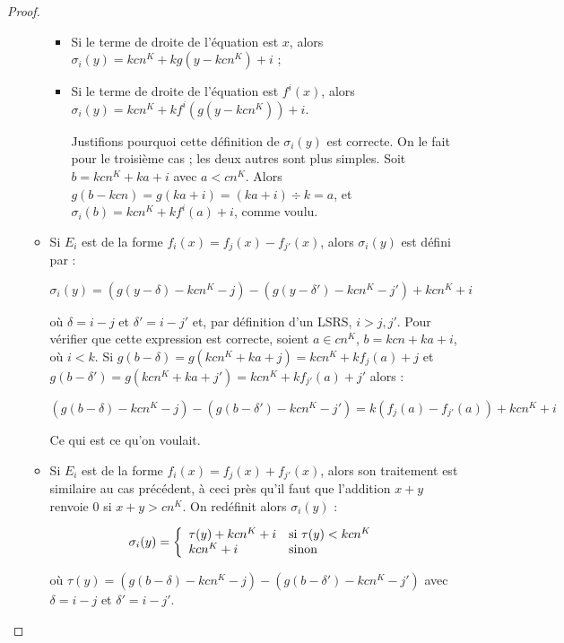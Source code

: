 \begin{appendices}
\begin{proof}
\begin{enumerate}[itemsep=-1mm,leftmargin=2cm]
\begin{itemize}[itemsep=-1mm, leftmargin=1cm]
\begin{itemize}[itemsep=-1mm,leftmargin=1cm]
						\item %
						Si le terme de droite de l'équation est $x$, alors $\sigma_i(y) = kcn^K + kg\left( y - kcn^K \right) + i$ ;
						
						\item %
						Si le terme de droite de l'équation est $f^i(x)$, alors $\sigma_i(y) = kcn^K + k f^i\left( g\left( y - kcn^K \right) \right) + i$.
						
						Justifions pourquoi cette définition de $\sigma_i(y)$ est correcte. On le fait pour le troisième cas ; les deux autres sont plus simples. Soit $b = kcn^K + ka + i$ avec $a < cn^K$. Alors $g(b-kcn) = g(ka + i) = (ka + i) \div k = a$, et $\sigma_i(b) = kcn^K + kf^i(a) + i$, comme voulu. 
					\end{itemize}
					
					
					\item
					Si $E_i$ est de la forme $f_i(x) = f_j(x) - f_{j'}(x)$, alors $\sigma_i(y)$ est défini par :
					
					\[
					\sigma_i(y) = \left( g(y - \delta) - k cn^K - j \right) - \left( g(y - \delta') - k cn^K - j' \right) + kcn^K + i
					\]
					
					où $\delta = i -j$ et $\delta' = i - j'$ et, par définition d'un LSRS, $i > j, j'$. Pour vérifier que cette expression est correcte, soient $a \in cn^K$, $b = kcn + ka + i$, où $i<k$. Si $g(b - \delta) = g(kcn^K + ka + j) = kcn^K + kf_j(a) + j$ et $g(b - \delta') = g(kcn^K + ka + j') = kcn^K + kf_{j'}(a) + j'$ alors :
					
					\[
					\left( g\left( b - \delta \right) - kcn^K - j \right) - \left( g\left( b - \delta' \right) - kcn^K - j' \right)
					=  k \left( f_{j}(a) - f_{j'}(a) \right) + kcn^K + i
					\]
					
					
					Ce qui est ce qu'on voulait.
					
					\item
					Si $E_i$ est de la forme $f_i(x) = f_j(x) + f_{j'}(x)$, alors son traitement est similaire au cas précédent, à ceci près qu'il faut que l'addition $x + y$ renvoie $0$ si $x + y > cn^K$. On redéfinit alors $\sigma_i(y)$ : 
					
					\[
					\sigma_i(y) = \left\lbrace \begin{array}{ll} 
						\tau(y) + kcn^K + i & \text{si $\tau(y) < kcn^K$} \\
						kcn^K + i & \text{sinon}
					 \end{array} \right.
					\]
					
					où $\tau(y) = \left( g\left( b - \delta \right) - kcn^K - j \right) - \left( g\left( b - \delta' \right) - kcn^K - j' \right)$ avec $\delta = i - j$ et $\delta' = i - j'$. 
					

\end{itemize}
\end{enumerate}
\end{proof}
\end{appendices}
